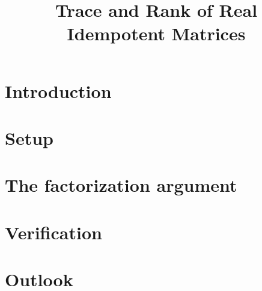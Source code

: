 \documentclass[11pt]{article}
\title{Trace and Rank of Real Idempotent Matrices}
\author{}
\date{}
\begin{document}
\maketitle

\section{Introduction}

\section{Setup}

\section{The factorization argument}

\section{Verification}

\section{Outlook}
\end{document}
